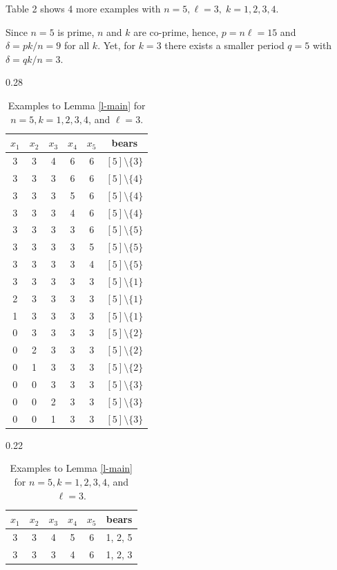 \documentclass[10pt]{article}
\theoremstyle{definition}
\begin{document}
Table 2 shows 4 more examples with $n=5, \ell = 3, \; k = 1,2,3,4$. 

Since $n = 5$ is prime, $n$ and $k$ are co-prime, hence, $p = n \ell = 15$ and $\delta = pk/n = 9$ for all $k$.   
Yet, for $k=3$ there exists a smaller period 
$q = 5$  with $\delta = q k / n = 3$. 


\begin{table}[t] 
\setlength\tabcolsep{0pt}
\small 
\caption{Examples to Lemma \ref{l-main} 
for $n=5, k = 1, 2, 3, 4$, and  $\ell = 3$.} 
\begin{subtable}{0.28\textwidth}
\begin{tabular*}{\linewidth}[t]{@{\extracolsep{\fill}}ccccc|c}
\toprule
$x_1$ & $x_2$ & $x_3$ & $x_4$  & $x_5$ & bears\\
\midrule
3& 3& 4& 6& 6& $[5]\setminus\{3\}$\\
3& 3& 3& 6& 6& $[5] \setminus \{4\}$\\
3& 3& 3& 5& 6& $[5] \setminus \{4\}$\\
\hline
3& 3& 3& 4& 6& $[5] \setminus \{4\}$\\
3& 3 &3& 3& 6 & $[5] \setminus \{5\}$\\
3& 3& 3& 3& 5& $[5] \setminus \{5\}$\\
\hline
3& 3& 3& 3& 4& $[5] \setminus \{5\}$\\
3& 3& 3& 3& 3& $[5] \setminus \{1\}$\\
2& 3& 3& 3& 3& $[5] \setminus \{1\}$\\
\hline
1& 3& 3& 3& 3& $[5] \setminus \{1\}$\\
0& 3& 3& 3& 3& $[5] \setminus \{2\}$\\
0& 2& 3& 3& 3& $[5] \setminus \{2\}$\\
\hline
0& 1& 3& 3& 3& $[5] \setminus \{2\}$\\
0& 0& 3& 3& 3& $[5] \setminus \{3\}$\\
0& 0& 2& 3& 3& $[5] \setminus \{3\}$\\
\hline
0& 0& 1& 3& 3& $[5] \setminus \{3\}$\\
\bottomrule
\end{tabular*}
\end{subtable}
\hfill
\begin{subtable}{0.22\textwidth}
\begin{tabular*}{\linewidth}[t]{@{\extracolsep{\fill}}ccccc|c}
\toprule
$x_1$ & $x_2$ & $x_3$ & $x_4$  & $x_5$ &  bears \\
\midrule
3 &3 &4 &5 &6  & 1, 2, 5\\
3 &3 &3 &4 &6  & 1, 2, 3 \\

\end{tabular*}
\end{subtable}
\end{table}
\end{document}
